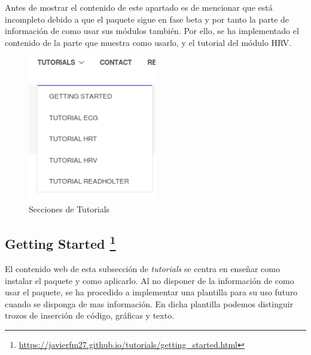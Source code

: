 Antes de mostrar el contenido de este apartado es de mencionar que está incompleto debido a que el paquete sigue en fase beta y por tanto la parte de información de como usar sus módulos también. Por ello, se ha implementado el contenido de la parte que muestra como usarlo, y el tutorial del módulo HRV. 

\begin{figure}[h!]
    \centering
    \includegraphics[width=0.5\textwidth]{img/tutorials_panel.png}
    \caption{Secciones de Tutorials }
    \label{fig:tutoWebPanel}
\end{figure}





\subsection[Getting Started]{Getting Started \footnote{\url{https://javierfm27.github.io/tutorials/getting_started.html}}}
El contenido web de esta subsección de \textit{tutorials} se centra en enseñar como instalar el paquete y como aplicarlo. Al no disponer de la información de como usar el paquete, se ha procedido a implementar una plantilla para su uso futuro cuando se disponga de mas información. En dicha plantilla podemos distinguir trozos de inserción de código, gráficas y texto. 


